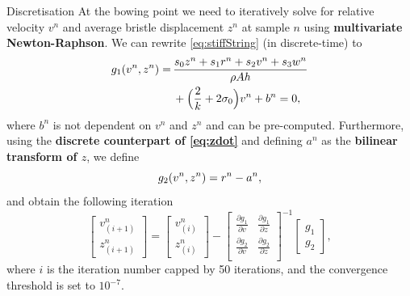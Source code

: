\documentclass[a0paper,portrait]{baposter}
\let\oldbf\textbf
\renewcommand{\textbf}[1]{\textcolor{aaublue1}{\oldbf{#1}}}
\begin{document}
\begin{poster}
\begin{posterbox}[name=discretisation, column=1, below=elasto2,above=bottom]{Discretisation}
    At the bowing point we need to iteratively solve for relative velocity $v^n$ and average bristle displacement $z^n$ at sample $n$ using \textbf{multivariate Newton-Raphson}.
    We can rewrite \eqref{eq:stiffString} (in discrete-time) to
    \vspace{-0.3em}
    \begin{equation}
    \begin{aligned}
        g_1(v^n, z^n) = \, &\frac{s_0z^n+s_1r^n+s_2v^n+s_3w^n}{\rho A h}
    \\&+\Big(\frac{2}{k} + 2\sigma_0 \Big)v^n
    + b^n= 0,
    \end{aligned}\vspace{-0.2em}
    \end{equation}
    where $b^n$ is not dependent on $v^n$ and $z^n$ and can be pre-computed. Furthermore, using the \textbf{discrete counterpart of \eqref{eq:zdot}} and defining $a^n$ as the \textbf{bilinear transform of $z$}, we define
    \vspace{-0.3em}\begin{equation}
        g_2(v^n, z^n) = r^n - a^n ,
        \vspace{-0.3em}
    \end{equation}
    and obtain the following iteration
    \begin{equation}\label{eq:NRit}
    \begin{bmatrix}
    v_{(i+1)}^n\\
    z_{(i+1)}^n
    \end{bmatrix}
    =
    \begin{bmatrix}
    v_{(i)}^n\\
    z_{(i)}^n
    \end{bmatrix}
    -
    \begin{bmatrix}
    \frac{\partial g_1}{\partial v} & \frac{\partial g_1}{\partial z}\\
    \frac{\partial g_2}{\partial v} & \frac{\partial g_2}{\partial z}\\
    \end{bmatrix}^{-1}
    \begin{bmatrix}
    g_1\\
    g_2
    \end{bmatrix}
    ,
\end{equation}
where $i$ is the iteration number capped by 50 iterations, and the convergence threshold is set to $10^{-7}$.


\end{posterbox}
\end{poster}
\end{document}
